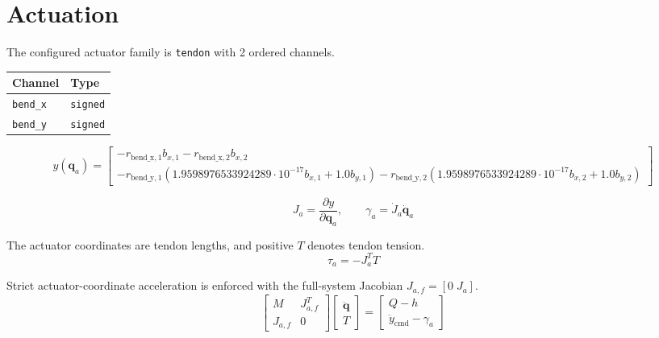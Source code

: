 \documentclass[11pt]{article}
\begin{document}
\section{Actuation}
The configured actuator family is \texttt{tendon} with 2 ordered channels.
\begin{center}
\begin{tabular}{ll}
\hline
Channel & Type \\
\hline
\texttt{bend\_x} & \texttt{signed} \\
\texttt{bend\_y} & \texttt{signed} \\
\hline
\end{tabular}
\end{center}
\begin{equation}
y(\boldsymbol q_a)=\begin{bmatrix}- r_{\mathrm{bend\_x},1} b_{x,1} - r_{\mathrm{bend\_x},2} b_{x,2}\\- r_{\mathrm{bend\_y},1} \left(1.9598976533924289 \cdot 10^{-17} b_{x,1} + 1.0 b_{y,1}\right) - r_{\mathrm{bend\_y},2} \left(1.9598976533924289 \cdot 10^{-17} b_{x,2} + 1.0 b_{y,2}\right)\end{bmatrix}
\end{equation}

\begin{equation}
J_a=\frac{\partial y}{\partial\boldsymbol q_a},\qquad \gamma_a=\dot J_a\dot{\boldsymbol q}_a
\end{equation}

The actuator coordinates are tendon lengths, and positive $T$ denotes tendon tension.
\begin{equation}
\tau_a=-J_a^TT
\end{equation}

Strict actuator-coordinate acceleration is enforced with the full-system Jacobian $J_{a,f}=[0\;J_a]$.
\begin{equation}
\begin{bmatrix}M&J_{a,f}^{T}\\J_{a,f}&0\end{bmatrix}\begin{bmatrix}\ddot{\boldsymbol q}\\T\end{bmatrix}=\begin{bmatrix}Q-h\\\ddot y_{\mathrm{cmd}}-\gamma_a\end{bmatrix}
\end{equation}
\end{document}
